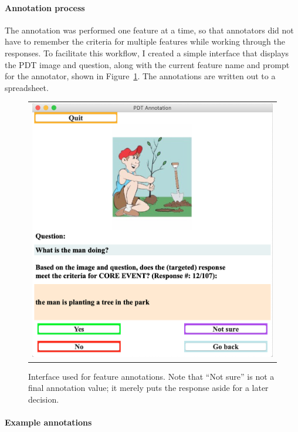\paragraph{Annotation process}
The annotation was performed one feature at a time, so that annotators did not have to remember the criteria for multiple features while working through the responses. To facilitate this workflow, I created a simple interface that displays the PDT image and question, along with the current feature name and prompt for the annotator, shown in Figure~\ref{fig:annotation-interface}. The annotations are written out to a spreadsheet.


\begin{figure}[htb!]
\begin{center}
\begin{tabular}{c}
\includegraphics[width=0.85\columnwidth]{figures/annotation_interface.jpg} \\
\end{tabular}
\caption{\label{fig:annotation-interface} Interface used for feature annotations. Note that ``Not sure'' is not a final annotation value; it merely puts the response aside for a later decision.}
\end{center}
\end{figure}


\paragraph{Example annotations}

